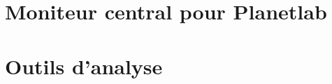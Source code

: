 \label{app:implementations}

\section{\udpping}

\section{\udpexplore}

\section{Moniteur central pour Planetlab}

\section{Outils d'analyse}
